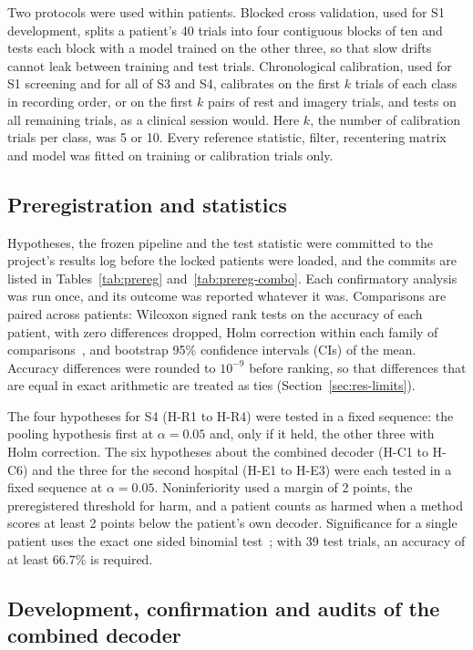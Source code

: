 \documentclass{ieeeaccess}
\begin{document}
Two protocols were used within patients. Blocked cross validation, used for S1 development, splits a patient's 40 trials into four contiguous blocks of ten and tests each block with a model trained on the other three, so that slow drifts cannot leak between training and test trials. Chronological calibration, used for S1 screening and for all of S3 and S4, calibrates on the first $k$ trials of each class in recording order, or on the first $k$ pairs of rest and imagery trials, and tests on all remaining trials, as a clinical session would. Here $k$, the number of calibration trials per class, was 5 or 10. Every reference statistic, filter, recentering matrix and model was fitted on training or calibration trials only.

\subsection{Preregistration and statistics}\label{sec:stats}

Hypotheses, the frozen pipeline and the test statistic were committed to the project's results log before the locked patients were loaded, and the commits are listed in Tables~\ref{tab:prereg} and~\ref{tab:prereg-combo}. Each confirmatory analysis was run once, and its outcome was reported whatever it was. Comparisons are paired across patients: Wilcoxon signed rank tests on the accuracy of each patient, with zero differences dropped, Holm correction within each family of comparisons~\cite{holm1979}, and bootstrap 95\% confidence intervals (CIs) of the mean. Accuracy differences were rounded to $10^{-9}$ before ranking, so that differences that are equal in exact arithmetic are treated as ties (Section~\ref{sec:res-limits}).

The four hypotheses for S4 (H-R1 to H-R4) were tested in a fixed sequence: the pooling hypothesis first at $\alpha = 0.05$ and, only if it held, the other three with Holm correction. The six hypotheses about the combined decoder (H-C1 to H-C6) and the three for the second hospital (H-E1 to H-E3) were each tested in a fixed sequence at $\alpha = 0.05$. Noninferiority used a margin of 2 points, the preregistered threshold for harm, and a patient counts as harmed when a method scores at least 2 points below the patient's own decoder. Significance for a single patient uses the exact one sided binomial test~\cite{combrisson2015}; with 39 test trials, an accuracy of at least 66.7\% is required.

\subsection{Development, confirmation and audits of the combined decoder}\label{sec:combo-setup}
\end{document}
